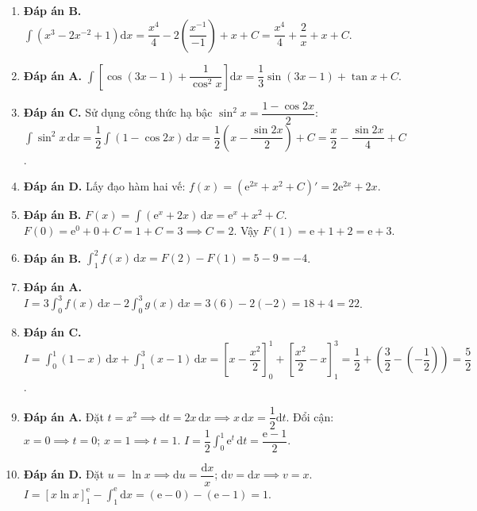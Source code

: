 \documentclass[12pt,a4paper]{article}
\begin{document}
\begin{enumerate}[start=16]
\item \textbf{Đáp án B.}  
$\int \left(x^3 - 2x^{-2} + 1\right)\mathrm{d}x = \dfrac{x^4}{4} - 2\left(\dfrac{x^{-1}}{-1}\right) + x + C = \dfrac{x^4}{4} + \dfrac{2}{x} + x + C$.

\item \textbf{Đáp án A.}  
$\int \left[\cos(3x - 1) + \dfrac{1}{\cos^2 x}\right]\mathrm{d}x = \dfrac{1}{3}\sin(3x - 1) + \tan x + C$.

\item \textbf{Đáp án C.}  
Sử dụng công thức hạ bậc $\sin^2 x = \dfrac{1 - \cos 2x}{2}$:  
$\int \sin^2 x\,\mathrm{d}x = \dfrac{1}{2}\int (1 - \cos 2x)\,\mathrm{d}x = \dfrac{1}{2}\left(x - \dfrac{\sin 2x}{2}\right) + C = \dfrac{x}{2} - \dfrac{\sin 2x}{4} + C$.

\item \textbf{Đáp án D.}  
Lấy đạo hàm hai vế: $f(x) = (\mathrm{e}^{2x} + x^2 + C)' = 2\mathrm{e}^{2x} + 2x$.

\item \textbf{Đáp án B.}  
$F(x) = \int (\mathrm{e}^x + 2x)\,\mathrm{d}x = \mathrm{e}^x + x^2 + C$.  
$F(0) = \mathrm{e}^0 + 0 + C = 1 + C = 3 \implies C = 2$.  
Vậy $F(1) = \mathrm{e} + 1 + 2 = \mathrm{e} + 3$.

\item \textbf{Đáp án B.}  
$\int_1^2 f(x)\,\mathrm{d}x = F(2) - F(1) = 5 - 9 = -4$.

\item \textbf{Đáp án A.}  
$I = 3\int_0^3 f(x)\,\mathrm{d}x - 2\int_0^3 g(x)\,\mathrm{d}x = 3(6) - 2(-2) = 18 + 4 = 22$.

\item \textbf{Đáp án C.}  
$I = \int_0^1 (1 - x)\,\mathrm{d}x + \int_1^3 (x - 1)\,\mathrm{d}x = \left[x - \dfrac{x^2}{2}\right]_0^1 + \left[\dfrac{x^2}{2} - x\right]_1^3 = \dfrac{1}{2} + \left(\dfrac{3}{2} - \left(-\dfrac{1}{2}\right)\right) = \dfrac{5}{2}$.

\item \textbf{Đáp án A.}  
Đặt $t = x^2 \implies \mathrm{d}t = 2x\,\mathrm{d}x \implies x\,\mathrm{d}x = \dfrac{1}{2}\mathrm{d}t$.  
Đổi cận: $x = 0 \implies t = 0$; $x = 1 \implies t = 1$.  
$I = \dfrac{1}{2}\int_0^1 \mathrm{e}^t\,\mathrm{d}t = \dfrac{\mathrm{e} - 1}{2}$.

\item \textbf{Đáp án D.}  
Đặt $u = \ln x \implies \mathrm{d}u = \dfrac{\mathrm{d}x}{x}$; $\mathrm{d}v = \mathrm{d}x \implies v = x$.  
$I = [x\ln x]_1^{\mathrm{e}} - \int_1^{\mathrm{e}} \mathrm{d}x = (\mathrm{e} - 0) - (\mathrm{e} - 1) = 1$.


\end{enumerate}
\end{document}
